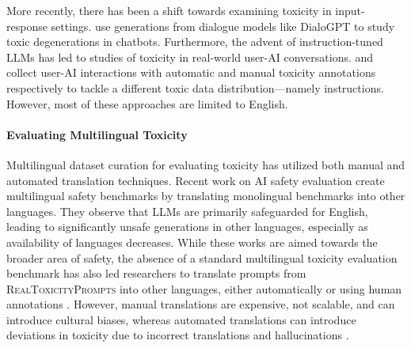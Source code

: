 More recently, there has been a shift towards examining toxicity in input-response settings. \citet{10.1145/3548606.3560599, baheti-etal-2021-just} use generations from dialogue models like DialoGPT \citep{zhang2019dialogpt} to study toxic degenerations in chatbots. Furthermore, the advent of instruction-tuned LLMs has led to studies of toxicity in real-world user-AI conversations. \citet{zheng2024realchatm} and \citet{lin-etal-2023-toxicchat} collect user-AI interactions with automatic and manual toxicity annotations respectively to tackle a different toxic data distribution---namely instructions. However, most of these approaches are limited to English.

\paragraph{Evaluating Multilingual Toxicity}
Multilingual dataset curation for evaluating toxicity has utilized both manual and automated translation techniques. Recent work on AI safety evaluation \citep{wang2023all, Yong2023LowResourceLJ, Deng2023MASTERKEYAJ} create multilingual safety benchmarks by translating monolingual benchmarks into other languages. They observe that LLMs are primarily safeguarded for English, leading to significantly unsafe generations in other languages, especially as availability of languages decreases. While these works are aimed towards the broader area of safety, the absence of a standard multilingual toxicity evaluation benchmark has also led researchers to translate prompts from \textsc{RealToxicityPrompts} into other languages, either automatically \citep{ustun2024aya} or using human annotations \citep{dewynter2024rtplx}. However, manual translations are expensive, not scalable, and can introduce cultural biases, whereas automated translations can introduce deviations in toxicity due to incorrect translations and hallucinations \citep{specia-etal-2021-findings, sharou-specia-2022-taxonomy, nllbteam2022language, costa-jussa-etal-2023-toxicity}. 

